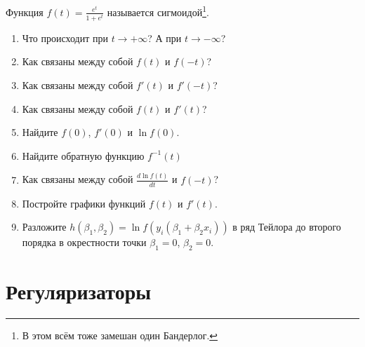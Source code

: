 \documentclass[12pt, a4paper, oneside]{article}
\theoremstyle{plain} %
\theoremstyle{definition}
\begin{document}
\begin{problem}
	Функция $f(t) = \frac{e^t}{1 + e^t}$ называется сигмоидой\footnote{В этом всём тоже замешан один Бандерлог.}.
	
		\begin{enumerate}
		\item Что происходит при $t \to +\infty$? А при $t \to -\infty$?
		\item Как связаны между собой $f(t)$ и  $f(-t)$?
		\item Как связаны между собой $f'(t)$ и  $f'(-t)$?
		\item Как связаны между собой $f(t)$ и $f'(t)$? 
		\item Найдите $f(0)$, $f'(0)$ и $\ln f(0)$.
		\item Найдите обратную функцию $f^{-1}(t)$
		\item Как связаны между собой $\frac{d\ln f(t)}{dt}$ и $f(-t)$?
		\item Постройте графики функций $f(t)$ и $f'(t)$.
		\item Разложите $h(\beta_1, \beta_2)=\ln f(y_i(\beta_1 + \beta_2 x_i))$ в ряд Тейлора до второго порядка в окрестности точки $\beta_1=0$, $\beta_2=0$.
	\end{enumerate}
\end{problem} 


\section{Регуляризаторы}


	
\end{document}
